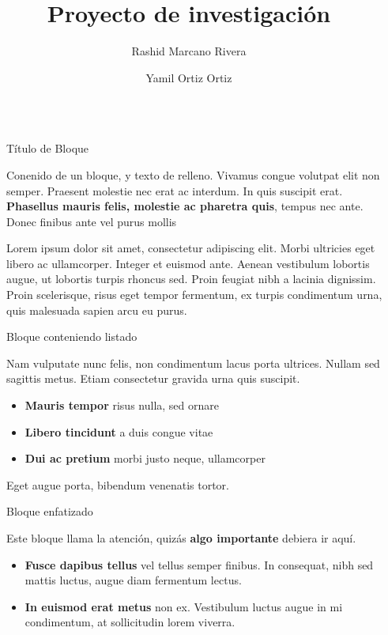 \documentclass[final]{beamer}
\title{Proyecto de investigación}
\author{Rashid Marcano Rivera \inst{1} \and Yamil Ortiz Ortiz \inst{2}}
\institute[shortinst]{\inst{1} Departamento de Sociología y Antropología \samelineand \inst{2} Centro de Investigaciones Sociales}
\newlength{\sepwidth}
\newlength{\colwidth}
\newcommand{\separatorcolumn}{\begin{column}{\sepwidth}\end{column}}
\begin{document}
\begin{frame}[t]
\begin{columns}[t]
\separatorcolumn

\begin{column}{\colwidth}

  \begin{block}{Título de Bloque}

    Conenido de un bloque, y texto de relleno. Vivamus congue volutpat elit non semper. Praesent molestie nec erat ac
    interdum. In quis suscipit erat. \textbf{Phasellus mauris felis, molestie
    ac pharetra quis}, tempus nec ante. Donec finibus ante vel purus mollis

    Lorem ipsum dolor sit amet, consectetur adipiscing elit. Morbi ultricies
    eget libero ac ullamcorper. Integer et euismod ante. Aenean vestibulum
    lobortis augue, ut lobortis turpis rhoncus sed. Proin feugiat nibh a
    lacinia dignissim. Proin scelerisque, risus eget tempor fermentum, ex
    turpis condimentum urna, quis malesuada sapien arcu eu purus.

  \end{block}

  \begin{block}{Bloque conteniendo listado}

    Nam vulputate nunc felis, non condimentum lacus porta ultrices. Nullam sed
    sagittis metus. Etiam consectetur gravida urna quis suscipit.

    \begin{itemize}
      \item \textbf{Mauris tempor} risus nulla, sed ornare
      \item \textbf{Libero tincidunt} a duis congue vitae
      \item \textbf{Dui ac pretium} morbi justo neque, ullamcorper
    \end{itemize}

    Eget augue porta, bibendum venenatis tortor.

  \end{block}

  \begin{alertblock}{Bloque enfatizado}

    Este bloque llama la atención, quizás \textbf{algo importante} debiera ir aquí.

    \begin{itemize}
      \item \textbf{Fusce dapibus tellus} vel tellus semper finibus. In
        consequat, nibh sed mattis luctus, augue diam fermentum lectus.
      \item \textbf{In euismod erat metus} non ex. Vestibulum luctus augue in
        mi condimentum, at sollicitudin lorem viverra.
    \end{itemize}


\end{alertblock}
\end{column}
\end{columns}
\end{frame}
\end{document}
